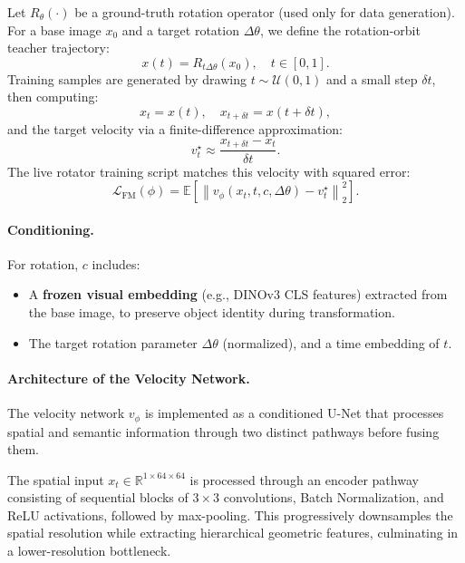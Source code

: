 \documentclass{article}
\begin{document}
Let $R_\theta(\cdot)$ be a ground-truth rotation operator (used only for data generation). For a base image $x_0$ and a target rotation $\Delta\theta$, we define the rotation-orbit teacher trajectory:
\begin{equation}
    x(t) = R_{t \Delta\theta}(x_0), \quad t \in [0,1].
\end{equation}
Training samples are generated by drawing $t \sim \mathcal{U}(0,1)$ and a small step $\delta t$, then computing:
\begin{equation}
    x_t = x(t), \quad x_{t+\delta t} = x(t+\delta t),
\end{equation}
and the target velocity via a finite-difference approximation:
\begin{equation}
    v^\star_t \approx \frac{x_{t+\delta t} - x_t}{\delta t}.
\end{equation}
The live rotator training script matches this velocity with squared error:
\begin{equation}
    \mathcal{L}_{\mathrm{FM}}(\phi) = \mathbb{E}\left[\left\lVert v_\phi(x_t, t, c, \Delta\theta) - v^\star_t \right\rVert_2^2\right].
\end{equation}

\paragraph{Conditioning.}
For rotation, $c$ includes:
\begin{itemize}
    \item A \textbf{frozen visual embedding} (e.g., DINOv3 CLS features) extracted from the base image, to preserve object identity during transformation.
    \item The target rotation parameter $\Delta\theta$ (normalized), and a time embedding of $t$.
\end{itemize}

\paragraph{Architecture of the Velocity Network.}
The velocity network $v_\phi$ is implemented as a conditioned U-Net that processes spatial and semantic information through two distinct pathways before fusing them.

The spatial input $x_t \in \mathbb{R}^{1 \times 64 \times 64}$ is processed through an encoder pathway consisting of sequential blocks of $3 \times 3$ convolutions, Batch Normalization, and ReLU activations, followed by max-pooling. This progressively downsamples the spatial resolution while extracting hierarchical geometric features, culminating in a lower-resolution bottleneck.
\end{document}
